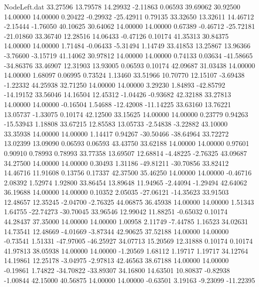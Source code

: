 \begin{filecontents}{NodeLeft.dat}
  33.27596   13.79578   14.29932    -2.11863    0.06593   39.69062   30.92500   14.00000   14.00000    0.20422   -0.29932  -25.42911    0.79135
  33.32650   13.32611   14.46712    -2.15444   -1.76050   40.10625   30.64062   14.00000   14.00000    0.67389   -0.46712  -25.72181  -21.01860
  33.36740   12.28516   14.06433    -0.47126    0.10174   41.35313   30.84375   14.00000   14.00000    1.71484   -0.06433   -5.31494    1.14749
  33.41853   13.25867   13.96366    -3.76600   -3.15719   41.14062   30.97812   14.00000   14.00000    0.74133    0.03634  -41.58665  -34.86376
  33.46907   12.31903   13.93005     0.06593    0.10174   42.09687   31.03438   14.00000   14.00000    1.68097    0.06995    0.73524    1.13460
  33.51966   10.70770   12.15107    -3.69438   -1.22332   44.25938   32.71250   14.00000   14.00000    3.29230    1.84893  -42.85792  -14.19152
  33.56046   14.16504   12.45312    -1.04426   -0.93682   42.32188   33.27813   14.00000   14.00000   -0.16504    1.54688  -12.42008  -11.14225
  33.63160   13.76221   13.05737    -1.33075    0.10174   42.12500   33.15625   14.00000   14.00000    0.23779    0.94263  -15.53943    1.18808
  33.67215   12.85583   13.05733    -2.54838   -3.22882   43.10000   33.35938   14.00000   14.00000    1.14417    0.94267  -30.50466  -38.64964
  33.72272   13.02399   13.09090     0.06593    0.06593   43.43750   33.62188   14.00000   14.00000    0.97601    0.90910    0.78993    0.78993
  33.77358   13.69507   12.68814    -4.48225   -2.76325   43.09687   34.27500   14.00000   14.00000    0.30493    1.31186  -49.81211  -30.70856
  33.82412   14.46716   11.91608     0.13756    0.17337   42.37500   35.46250   14.00000   14.00000   -0.46716    2.08392    1.52974    1.92800
  33.86454   13.89648   11.94965    -2.44094   -1.29494   42.64062   36.19688   14.00000   14.00000    0.10352    2.05035  -27.06121  -14.35623
  33.91503   12.48657   12.35245    -2.04700   -2.76325   44.06875   36.45938   14.00000   14.00000    1.51343    1.64755  -22.74273  -30.70045
  33.96546   12.99042   11.88251    -0.65032    0.10174   44.28437   37.35000   14.00000   14.00000    1.00958    2.11749   -7.44785    1.16523
  34.02631   14.73541   12.48669    -4.01669   -3.87344   42.90625   37.52188   14.00000   14.00000   -0.73541    1.51331  -47.97005  -46.25927
  34.07713   15.20569   12.31888     0.10174    0.10174   41.97813   38.05938   14.00000   14.00000   -1.20569    1.68112    1.19717    1.19717
  34.12764   14.19861   12.25178    -3.04975   -2.97813   42.46563   38.67188   14.00000   14.00000   -0.19861    1.74822  -34.70822  -33.89307
  34.16800   14.63501   10.80837    -0.82938   -1.00844   42.15000   40.56875   14.00000   14.00000   -0.63501    3.19163   -9.23099  -11.22395

\end{filecontents}
